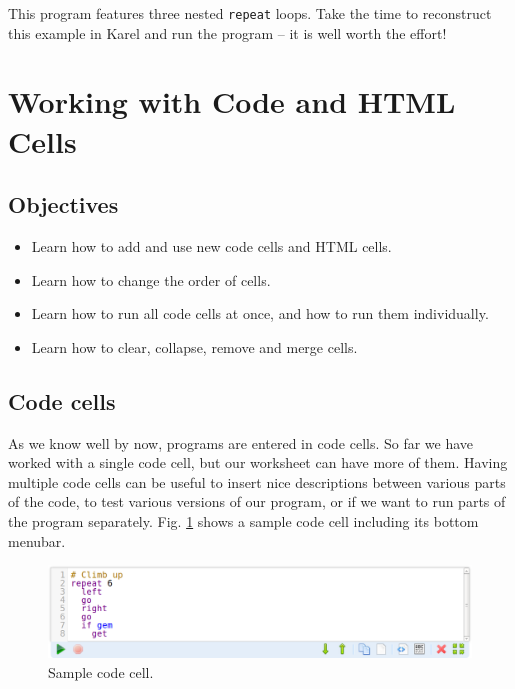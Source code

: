 \noindent
This program features three nested {\tt repeat} loops. Take the time to 
reconstruct this example in Karel and run the program -- it is well worth the effort!

\section{Working with Code and HTML Cells} \label{sec:editmenu}

\subsection{Objectives} 
 
\begin{itemize}
\item Learn how to add and use new code cells and HTML cells.
\item Learn how to change the order of cells.
\item Learn how to run all code cells at once, and how to run them individually.
\item Learn how to clear, collapse, remove and merge cells.
\end{itemize}

\subsection{Code cells}

As we know well by now, programs are entered in code cells. So far we have worked with 
a single code cell, but our worksheet can have more of them. 
Having multiple code cells can be useful to insert nice descriptions 
between various parts of the code, to test various versions 
of our program, or if we want to run parts of the program separately. Fig. 
\ref{fig:menu-111} shows a sample code cell including its bottom menubar. 

\begin{figure}[!ht]
\begin{center}
\includegraphics[width=16cm]{img/menu-114.png}
\caption{Sample code cell.}
\label{fig:menu-111}
\end{center}
\end{figure}


